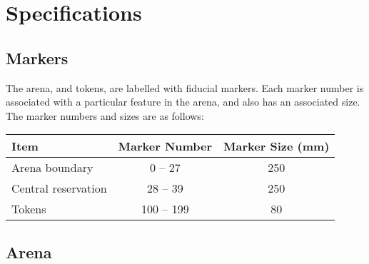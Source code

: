 \section{Specifications}
\label{sec:specs}

\subsection{Markers}
\label{spec:markers}

The arena, and tokens, are labelled with fiducial markers. Each
marker number is associated with a particular feature in the arena,
and also has an associated size.  The marker numbers and sizes are
as follows:

\begin{center}
\begin{tabular}{lcc}
  \toprule
  \textbf{Item} & \textbf{Marker Number} & \textbf{Marker Size (\si{mm})} \\
  \midrule
  Arena boundary & 0 -- 27 & 250 \\
  Central reservation & 28 -- 39 & 250  \\
  Tokens & 100 -- 199 & 80 \\
  \bottomrule
\end{tabular}
\end{center}

\subsection{Arena}
\label{spec:arena}

